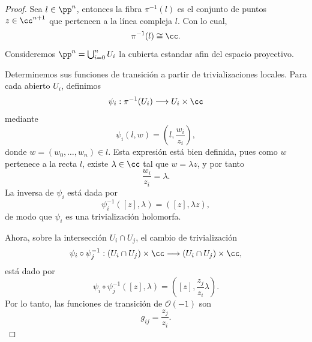	\begin{proof}
		Sea $l\in\pp^n$, entonces la fibra $\pi^{-1}(l)$ es el conjunto de puntos $z\in\cc^{n+1}$ que pertencen a la línea compleja $l$. Con lo cual,
		\begin{equation*}
			\pi^{-1}(l)\cong \cc.
		\end{equation*}
		Consideremos $\pp^n=\bigcup_{i=0}^n U_i$ la cubierta estandar afin del espacio proyectivo. 
		
		Determinemos sus funciones de transición a partir de trivializaciones locales. Para cada abierto $U_i$, definimos
		\begin{equation*}
			\psi_i:\pi^{-1}(U_i)\longrightarrow U_i\times \cc
		\end{equation*}
		mediante
		\begin{equation*}
			\psi_i(l,w)=
			\left(
			l,
			\frac{w_i}{z_i}
			\right),
		\end{equation*}
		donde $w=(w_0,\dots,w_n)\in l$. Esta expresión está bien definida, pues como $w$ pertenece a la recta $l$, existe $\lambda\in\cc$ tal que $w=\lambda z$, y por tanto
		\begin{equation*}
			\frac{w_i}{z_i}=\lambda.
		\end{equation*}
		La inversa de $\psi_i$ está dada por
		\begin{equation*}
			\psi_i^{-1}([z],\lambda)=([z],\lambda z),
		\end{equation*}
		de modo que $\psi_i$ es una trivialización holomorfa.
		
		Ahora, sobre la intersección $U_i\cap U_j$, el cambio de trivialización
		\begin{equation*}
			\psi_i\circ \psi_j^{-1}:
			(U_i\cap U_j)\times\cc
			\longrightarrow
			(U_i\cap U_j)\times\cc,
		\end{equation*}
		está dado por
		\begin{equation*}
			\psi_i\circ \psi_j^{-1}([z],\lambda)
			=\left([z],\frac{z_j}{z_i}\lambda \right).
		\end{equation*}
		Por lo tanto, las funciones de transición de $\mathcal{O}(-1)$ son
		\begin{equation*}
			g_{ij}=\frac{z_j}{z_i}.
		\end{equation*}
	\end{proof}
	
